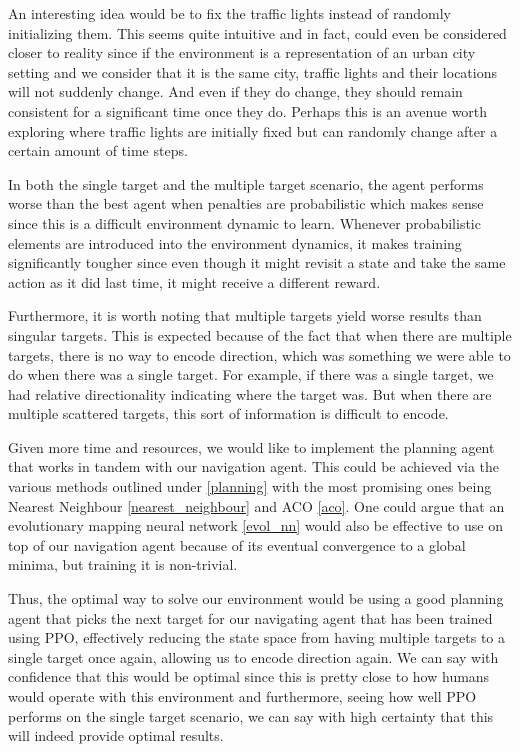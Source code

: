 \documentclass{article}
\begin{document}
    An interesting idea would be to fix the traffic lights instead of randomly initializing them. This seems quite intuitive and in fact, could even be considered closer to reality since if the environment is a representation of an urban city setting and we consider that it is the same city, traffic lights and their locations will not suddenly change. And even if they do change, they should remain consistent for a significant time once they do. Perhaps this is an avenue worth exploring where traffic lights are initially fixed but can randomly change after a certain amount of time steps. 
    
    In both the single target and the multiple target scenario, the agent performs worse than the best agent when penalties are probabilistic which makes sense since this is a difficult environment dynamic to learn. Whenever probabilistic elements are introduced into the environment dynamics, it makes training significantly tougher since even though it might revisit a state and take the same action as it did last time, it might receive a different reward.
    
    Furthermore, it is worth noting that multiple targets yield worse results than singular targets. This is expected because of the fact that when there are multiple targets, there is no way to encode direction, which was something we were able to do when there was a single target. For example, if there was a single target, we had relative directionality indicating where the target was. But when there are multiple scattered targets, this sort of information is difficult to encode. 
    
    Given more time and resources, we would like to implement the planning agent that works in tandem with our navigation agent. This could be achieved via the various methods outlined under \ref{planning} with the most promising ones being Nearest Neighbour \ref{nearest_neighbour} and ACO \ref{aco}. One could argue that an evolutionary mapping neural network \ref{evol_nn} would also be effective to use on top of our navigation agent because of its eventual convergence to a global minima, but training it is non-trivial.
    
    Thus, the optimal way to solve our environment would be using a good planning agent that picks the next target for our navigating agent that has been trained using PPO, effectively reducing the state space from having multiple targets to a single target once again, allowing us to encode direction again. We can say with confidence that this would be optimal since this is pretty close to how humans would operate with this environment and furthermore, seeing how well PPO performs on the single target scenario, we can say with high certainty that this will indeed provide optimal results.
    
\end{document}
